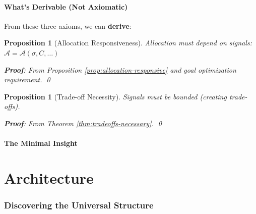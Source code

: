 \documentclass[11pt,a4paper]{article}
\newtheorem{proposition}[theorem]{Proposition}
\theoremstyle{definition}
\theoremstyle{remark}
\newcommand{\A}{\mathcal{A}}
\begin{document}
\subsection{What's Derivable (Not Axiomatic)}

From these three axioms, we can \textbf{derive}:

\begin{proposition}[Allocation Responsiveness]
Allocation must depend on signals: $\A = \A(\sigma, C, \ldots)$

\textbf{Proof}: From Proposition \ref{prop:allocation-responsive} and goal optimization requirement. \qed
\end{proposition}

\begin{proposition}[Trade-off Necessity]
Signals must be bounded (creating trade-offs).

\textbf{Proof}: From Theorem \ref{thm:tradeoffs-necessary}. \qed
\end{proposition}

\subsection{The Minimal Insight}

\begin{center}
\end{center}

\part{Architecture}

\section{Discovering the Universal Structure}
\end{document}
